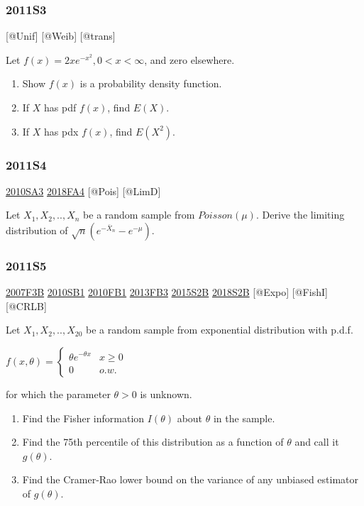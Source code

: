 \documentclass[6pt,twocolumn,Portrait]{article}
\begin{document}
\hypertarget{s3-2}{%
\subsubsection{2011S3}\label{s3-2}}

{[}@Unif{]} {[}@Weib{]} {[}@trans{]}

Let \(f(x)=2xe^{-x^2},0<x<\infty\), and zero elsewhere.

\begin{enumerate}
\def\labelenumi{(\alph{enumi})}
\item
  Show \(f(x)\) is a probability density function.
\item
  If \(X\) has pdf \(f(x)\), find \(E(X)\).
\item
  If \(X\) has pdx \(f(x)\), find \(E(X^2)\).
\end{enumerate}

\hypertarget{s4-2}{%
\subsubsection{2011S4}\label{s4-2}}

\protect\hyperlink{sa3-1}{2010SA3} \protect\hyperlink{fa4-4}{2018FA4}
{[}@Pois{]} {[}@LimD{]}

Let \(X_1,X_2,..,X_n\) be a random sample from \(Poisson(\mu)\). Derive
the limiting distribution of \(\sqrt{n}(e^{-\bar X_n}-e^{-\mu})\).

\hypertarget{s5-2}{%
\subsubsection{2011S5}\label{s5-2}}

\protect\hyperlink{f3b}{2007F3B} \protect\hyperlink{sb1-1}{2010SB1}
\protect\hyperlink{fb1-1}{2010FB1} \protect\hyperlink{fb3-2}{2013FB3}
\protect\hyperlink{s2b-1}{2015S2B} \protect\hyperlink{s2b-2}{2018S2B}
{[}@Expo{]} {[}@FishI{]} {[}@CRLB{]}

Let \(X_1,X_2,..,X_{20}\) be a random sample from exponential
distribution with p.d.f.

\(f(x,\theta)=\begin{cases}\theta e^{-\theta x}& x\ge0\\0& o.w.\end{cases}\)

for which the parameter \(\theta>0\) is unknown.

\begin{enumerate}
\def\labelenumi{(\alph{enumi})}
\item
  Find the Fisher information \(I(\theta)\) about \(\theta\) in the
  sample.
\item
  Find the 75th percentile of this distribution as a function of
  \(\theta\) and call it \(g(\theta)\).
\item
  Find the Cramer-Rao lower bound on the variance of any unbiased
  estimator of \(g(\theta)\).
\end{enumerate}
\end{document}
